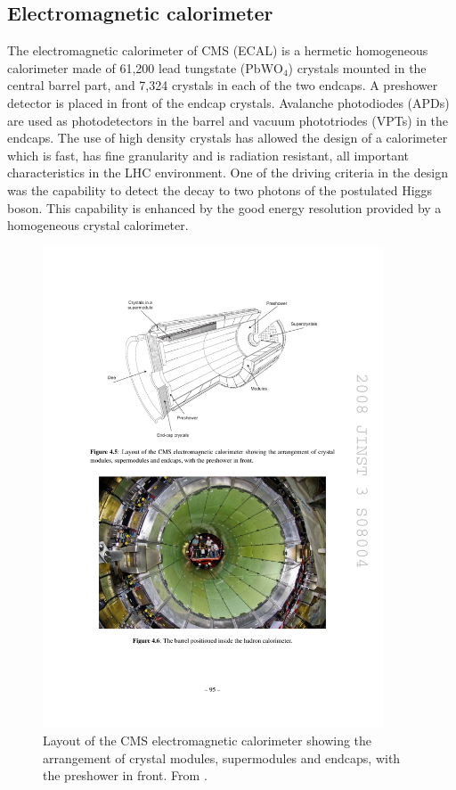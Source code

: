 \subsection{Electromagnetic calorimeter}
The electromagnetic calorimeter of CMS (ECAL) is a hermetic homogeneous calorimeter made of
61,200 lead tungstate ($\textrm{PbWO}_{\textrm{4}}$) crystals mounted in the central barrel part,
and 7,324 crystals in each of the two endcaps. 
A preshower detector is placed in front of the endcap crystals.
Avalanche photodiodes (APDs) are used as photodetectors in the barrel and vacuum phototriodes
(VPTs) in the endcaps. The use of high density crystals has allowed the design of a calorimeter
which is fast, has fine granularity and is radiation resistant, all important characteristics in the LHC
environment. 
One of the driving criteria in the design was the capability to detect the decay to two
photons of the postulated Higgs boson.
This capability is enhanced by the good energy resolution
provided by a homogeneous crystal calorimeter.

\begin{figure}
\centering
\includegraphics[width=0.9\textwidth]{figures/ecal_layout.pdf}
\caption{Layout of the CMS electromagnetic calorimeter showing the arrangement of crystal
modules, supermodules and endcaps, with the preshower in front. From \cite{Chatrchyan:2008aa}.}
\label{fig:ecal_layout}
\end{figure}

